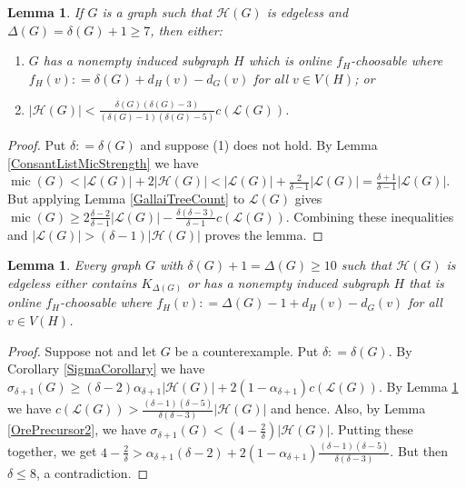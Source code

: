\documentclass[12pt]{article}
\theoremstyle{plain}
\newtheorem{lem}[thm]{Lemma}
\theoremstyle{definition}
\theoremstyle{remark}
\newcommand{\fancy}[1]{\mathcal{#1}}
\renewcommand{\L}{\fancy{L}}
\newcommand{\HH}{\fancy{H}}
\newcommand{\card}[1]{\left|#1\right|}
\newcommand{\parens}[1]{\left( #1 \right)}
\newcommand{\DefinedAs}{\mathrel{\mathop:}=}
\newcommand{\mic}{\operatorname{mic}}
\begin{document}
\begin{lem}\label{OrePrecursor3}
If $G$ is a graph such that $\HH(G)$ is edgeless and $\Delta(G) = \delta(G) + 1 \geq 7$, then either:
\begin{enumerate}
\item $G$ has a nonempty induced subgraph $H$ which is online $f_H$-choosable where $f_H(v) \DefinedAs \delta(G) + d_H(v) - d_G(v)$ for all $v \in V(H)$; or
\item $\card{\HH(G)} < \frac{\delta(G)(\delta(G)-3)}{(\delta(G)-1)(\delta(G)-5)}c(\L(G))$.
\end{enumerate}
\end{lem}
\begin{proof}
Put $\delta \DefinedAs \delta(G)$ and suppose (1) does not hold.  By Lemma \ref{ConsantListMicStrength} we have $\mic(G) < \card{\L(G)} + 2\card{\HH(G)} < \card{\L(G)} + \frac{2}{\delta - 1}\card{\L(G)} = \frac{\delta+1}{\delta-1}\card{\L(G)}$.  But applying Lemma \ref{GallaiTreeCount} to $\L(G)$ gives $\mic(G) \geq 2\frac{\delta-2}{\delta-1}\card{\L(G)} - \frac{\delta(\delta-3)}{\delta-1}c(\L(G))$.  Combining these inequalities and $\card{\L(G)} > (\delta-1)\card{\HH(G)}$ proves the lemma.
\end{proof}

\begin{lem}\label{EdgelessEuler}
Every graph $G$ with $\delta(G) + 1 = \Delta(G) \geq 10$ such that $\HH(G)$ is edgeless either contains $K_{\Delta(G)}$ or has a nonempty induced subgraph $H$ that is online $f_H$-choosable where $f_H(v) \DefinedAs \Delta(G) - 1 + d_H(v) - d_G(v)$ for all $v \in V(H)$.
\end{lem}
\begin{proof}
Suppose not and let $G$ be a counterexample.  Put $\delta \DefinedAs \delta(G)$. By Corollary \ref{SigmaCorollary} we have $\sigma_{\delta + 1}(G) \geq (\delta-2)\alpha_{\delta + 1}\card{\HH(G)} + 2(1-\alpha_{\delta + 1})c(\L(G))$.  By Lemma \ref{OrePrecursor3} we have $c(\L(G)) > \frac{(\delta-1)(\delta-5)}{\delta(\delta-3)}\card{\HH(G)}$ and hence. Also, by Lemma \ref{OrePrecursor2}, we have $\sigma_{\delta + 1}(G) < \parens{4 - \frac{2}{\delta}}\card{\HH(G)}$.  Putting these together, we get $4 - \frac{2}{\delta} > \alpha_{\delta + 1}(\delta - 2) + 2(1-\alpha_{\delta + 1})\frac{(\delta-1)(\delta-5)}{\delta(\delta-3)}$. But then $\delta \leq 8$, a contradiction.
\end{proof}
\end{document}
